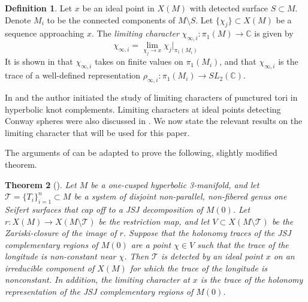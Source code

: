 \documentclass{article}
\theoremstyle{plain}
\newtheorem{theorem}{Theorem}[section]
\theoremstyle{definition}
\newtheorem{definition}[theorem]{Definition}
\theoremstyle{plain}
\theoremstyle{plain}
\theoremstyle{plain}
\theoremstyle{remark}
\theoremstyle{remark}
\theoremstyle{plain}
\theoremstyle{plain}
\begin{document}
\begin{definition}
Let $x$ be an ideal point in $X(M)$ with detected surface $S \subset M$. Denote $M_i$ to be the connected components of $M \setminus S$. Let $\{\chi_j\} \subset X(M)$ be a sequence approaching $x$. The \emph{limiting character} $\chi_{\infty, i}: \pi_1(M) \to \mathbb{C}$ is given by 
\begin{equation}
	\chi_{\infty, i} = \lim_{\chi_j \to x}\chi_j|_{\pi_1(M_i)}
\end{equation}
It is shown in \cite{cullershalen} that $\chi_{\infty, i}$ takes on finite values on $\pi_1(M_i)$, and that $\chi_{\infty, i}$ is the trace of a well-defined representation $\rho_{\infty, i}: \pi_1(M_i) \to SL_2(\mathbb{C})$.
\end{definition}

In \cite{wang} and \cite{twicepunctured} the author initiated the study of limiting characters of punctured tori in hyperbolic knot complements. Limiting characters at ideal points detecting Conway spheres were also discussed in \cite{paoluzziporti}. We now state the relevant results on the limiting character that will be used for this paper. 

%
%

The arguments of \cite{wang} can be adapted to prove the following, slightly modified theorem. 

\begin{theorem}[\cite{wang}]\label{thm:genusone}
Let $M$ be a one-cusped hyperbolic 3-manifold, and let $\mathcal{T} = \{T_i\}_{i=1}^n \subset M$ be a system of disjoint non-parallel, non-fibered genus one Seifert surfaces that cap off to a JSJ decomposition of $M(0)$. Let $r: X(M) \to X(M \setminus \mathcal{T})$ be the restriction map, and let $V \subset X(M \setminus \mathcal{T})$ be the Zariski-closure of the image of $r$. Suppose that the holonomy traces of the JSJ complementary regions of $M(0)$ are a point $\chi \in V$ such that the trace of the longitude is non-constant near $\chi$. Then $\mathcal{T}$ is detected by an ideal point $x$ on an irreducible component of $X(M)$ for which the trace of the longitude is nonconstant. In addition, the limiting character at $x$ is the trace of the holonomy representation of the JSJ complementary regions of $M(0)$. 
\end{theorem}
\end{document}
